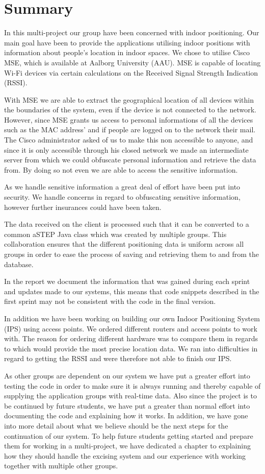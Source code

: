\chapter*{Summary}
In this multi-project our group have been concerned with indoor positioning. Our main goal have been to provide the applications utilising indoor positions with information about people's location in indoor spaces. We chose to utilise Cisco MSE, which is available at Aalborg University (AAU). MSE is capable of locating Wi-Fi devices via certain calculations on the Received Signal Strength Indication (RSSI).

With MSE we are able to extract the geographical location of all devices within the boundaries of the system, even if the device is not connected to the network. However, since MSE grants us access to personal informations of all the devices such as the MAC address' and if people are logged on to the network their mail. The Cisco administrator asked of us to make this non accessible to anyone, and since it is only accessible through his closed network we made an intermediate server from which we could obfuscate personal information and retrieve the data from. By doing so not even we are able to access the sensitive information. 

As we handle sensitive information a great deal of effort have been put into security. We handle concerns in regard to obfuscating sensitive information, however further insurances could have been taken.

The data received on the client is processed such that it can be converted to a common aSTEP Java class which was created by multiple groups. This collaboration ensures that the different positioning data is uniform across all groups in order to ease the process of saving and retrieving them to and from the database.

In the report we document the information that was gained during each sprint and updates made to our systems, this means that code snippets described in the first sprint may not be consistent with the code in the final version.

In addition we have been working on building our own Indoor Positioning System (IPS) using access points. We ordered different routers and access points to work with. The reason for ordering different hardware was to compare them in regards to which would provide the most precise location data. We ran into difficulties in regard to getting the RSSI and were therefore not able to finish our IPS.

As other groups are dependent on our system we have put a greater effort into testing the code in order to make sure it is always running and thereby capable of supplying the application groups with real-time data.
Also since the project is to be continued by future students, we have put a greater than normal effort into documenting the code and explaining how it works. In addition, we have gone into more detail about what we believe should be the next steps for the continuation of our system.
To help future students getting started and prepare them for working in a multi-project, we have dedicated a chapter to explaining how they should handle the excising system and our experience with working together with multiple other groups. 